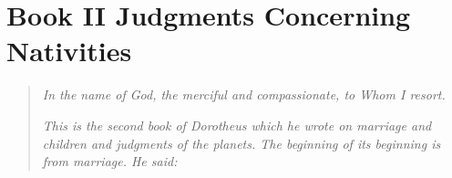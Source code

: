 \chapter{Book II Judgments Concerning Nativities}
\begin{quote}
\textsl{In the name of God, the merciful and compassionate, to Whom I resort.}

\textsl{This is the second book of Dorotheus which he wrote on marriage and children and judgments of the planets. The beginning of its beginning is from marriage. He said:}
\end{quote}




